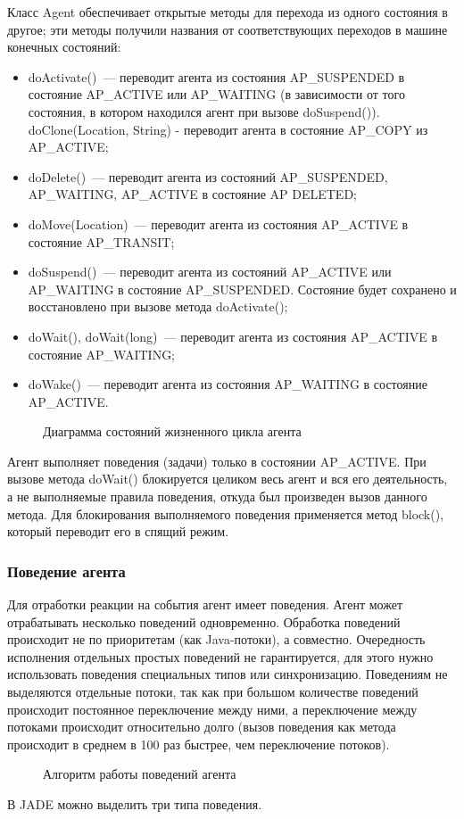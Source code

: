 Класс Agent обеспечивает открытые методы для перехода из одного состояния в другое; эти методы получили названия от соответствующих переходов в машине конечных состояний:
\begin{itemize}
\item doActivate()~--- переводит агента из состояния AP\_SUSPENDED в состояние AP\_ACTIVE или AP\_WAITING (в зависимости от того состояния, в котором находился агент при вызове doSuspend()). doClone(Location, String) - переводит агента в состояние AP\_COPY из AP\_ACTIVE;
\item doDelete()~--- переводит агента из состояний AP\_SUSPENDED, AP\_WAITING, AP\_ACTIVE в состояние AP DELETED;
\item doMove(Location)~--- переводит агента из состояния AP\_ACTIVE в состояние AP\_TRANSIT;
\item doSuspend()~--- переводит агента из состояний AP\_ACTIVE или AP\_WAITING в состояние AP\_SUSPENDED. Состояние будет сохранено и восстановлено при вызове метода doActivate();
\item doWait(), doWait(long)~--- переводит агента из состояния AP\_ACTIVE в состояние AP\_WAITING;
\item doWake()~--- переводит агента из состояния AP\_WAITING в состояние AP\_ACTIVE.
\end{itemize}

\begin{figure}[h]
\caption{Диаграмма состояний жизненного цикла агента}
\label{2:life-cycle}
\end{figure}

Агент выполняет поведения (задачи) только в состоянии AP\_ACTIVE. При вызове метода doWait() блокируется целиком весь агент и вся его деятельность, а не выполняемые правила поведения, откуда был произведен вызов данного метода. Для блокирования выполняемого поведения применяется метод block(), который переводит его в спящий режим.

\subsubsection{Поведение агента}
Для отработки реакции на события агент имеет поведения. Агент может отрабатывать несколько поведений одновременно. Обработка поведений происходит не по приоритетам (как Java-потоки), а совместно. Очередность исполнения отдельных простых поведений не гарантируется, для этого нужно использовать поведения специальных типов или синхронизацию.
Поведениям не выделяются отдельные потоки, так как при большом количестве поведений происходит постоянное переключение между ними, а переключение между потоками происходит относительно долго (вызов поведения как метода происходит в среднем в 100 раз быстрее, чем переключение потоков).
\begin{figure}[h!]
\caption{Алгоритм работы поведений агента}
\label{2:behs}
\end{figure}
В JADE можно выделить три типа поведения.

